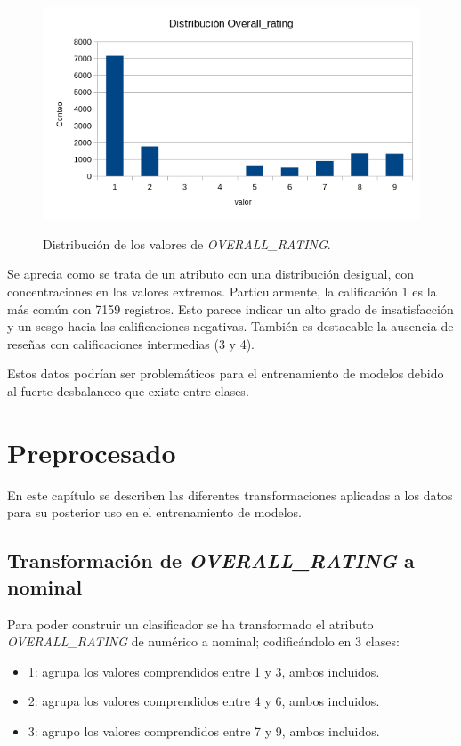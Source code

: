 \documentclass[es]{uc3mreport}
\begin{document}
\begin{report}
\begin{figure}[H]
    \center
    \includegraphics[width=0.85\linewidth]{distribucion_overall.png}\\
    \caption{Distribución de los valores de \textit{OVERALL\_RATING}.}
    \label{distribucion-overall}
\end{figure}

Se aprecia como se trata de un atributo con una distribución desigual, con
concentraciones en los valores extremos. Particularmente, la calificación 1 es
la más común con 7159 registros. Esto parece indicar un alto grado de
insatisfacción y un sesgo hacia las calificaciones negativas.
También es destacable la ausencia de reseñas con calificaciones intermedias (3 y
4).

Estos datos podrían ser problemáticos para el entrenamiento de modelos debido al
fuerte desbalanceo que existe entre clases.

\section{Preprocesado}
\label{chap:preprocess}
En este capítulo se describen las diferentes transformaciones aplicadas a los datos para su posterior uso en el entrenamiento de modelos.

\subsection{Transformación de \textit{OVERALL\_RATING} a nominal}
\label{sec:overalltransform}
Para poder construir un clasificador se ha transformado el atributo \textit{OVERALL\_RATING} de numérico a nominal; codificándolo en 3 clases:
\begin{itemize}
    \item 1: agrupa los valores comprendidos entre 1 y 3, ambos incluidos.
    \item 2: agrupa los valores comprendidos entre 4 y 6, ambos incluidos.
    \item 3: agrupo los valores comprendidos entre 7 y 9, ambos incluidos.
\end{itemize}


\end{report}
\end{document}
